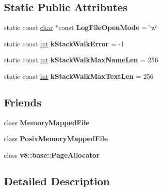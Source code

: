 \subsection*{Static Public Attributes}
\begin{DoxyCompactItemize}
\item 
\mbox{\label{classv8_1_1base_1_1OS_a4fee8706153911cacd3c3c58f17e49c6}} 
static const \mbox{\hyperlink{classchar}{char}} $\ast$const {\bfseries Log\+File\+Open\+Mode} = \char`\"{}w\char`\"{}
\item 
\mbox{\label{classv8_1_1base_1_1OS_abb7fec618d8fdfb357903e5f30aed605}} 
static const \mbox{\hyperlink{classint}{int}} {\bfseries k\+Stack\+Walk\+Error} = -\/1
\item 
\mbox{\label{classv8_1_1base_1_1OS_a56a4e15bc8d825319f97c24c4f86c7ca}} 
static const \mbox{\hyperlink{classint}{int}} {\bfseries k\+Stack\+Walk\+Max\+Name\+Len} = 256
\item 
\mbox{\label{classv8_1_1base_1_1OS_ab2145f00362a85b3d6e1be7654d44774}} 
static const \mbox{\hyperlink{classint}{int}} {\bfseries k\+Stack\+Walk\+Max\+Text\+Len} = 256
\end{DoxyCompactItemize}
\subsection*{Friends}
\begin{DoxyCompactItemize}
\item 
\mbox{\label{classv8_1_1base_1_1OS_aef5475229308093e4e94c5a41d93d01b}} 
class {\bfseries Memory\+Mapped\+File}
\item 
\mbox{\label{classv8_1_1base_1_1OS_a04f12d0ce175fa7d323ae305cf7b73f2}} 
class {\bfseries Posix\+Memory\+Mapped\+File}
\item 
\mbox{\label{classv8_1_1base_1_1OS_a82e6b639c5556d2c4805d007a8461191}} 
class {\bfseries v8\+::base\+::\+Page\+Allocator}
\end{DoxyCompactItemize}


\subsection{Detailed Description}


